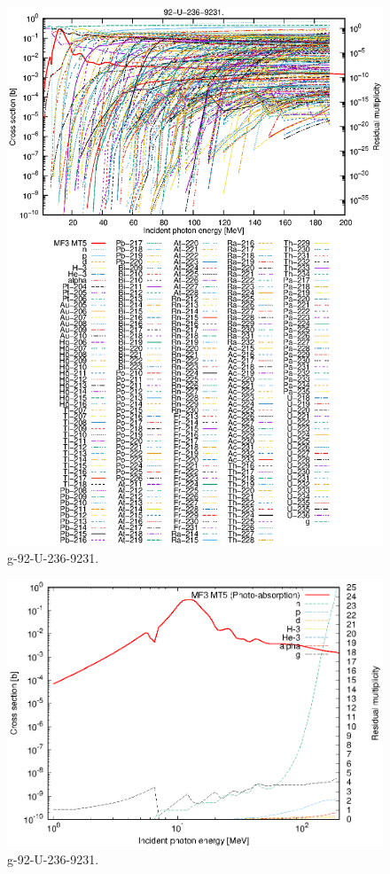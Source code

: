 \begin{figure}
 \includegraphics[width=\linewidth]{eps/g_92-U-236_9231.eps}
  \caption{g-92-U-236-9231.}
\end{figure}
\newpage \clearpage

\begin{figure}
 \includegraphics[width=\linewidth]{eps-log/g_92-U-236_9231.eps}
 \caption{g-92-U-236-9231.}
\end{figure}
\newpage \clearpage

